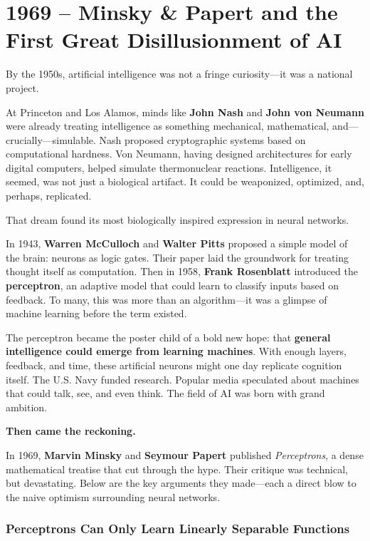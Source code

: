 \section{1969 – Minsky \& Papert and the First Great Disillusionment of AI}

By the 1950s, artificial intelligence was not a fringe curiosity—it was a national project.

At Princeton and Los Alamos, minds like \textbf{John Nash} and \textbf{John von Neumann} were already treating intelligence as something mechanical, mathematical, and—crucially—simulable. Nash proposed cryptographic systems based on computational hardness. Von Neumann, having designed architectures for early digital computers, helped simulate thermonuclear reactions. Intelligence, it seemed, was not just a biological artifact. It could be weaponized, optimized, and, perhaps, replicated.

That dream found its most biologically inspired expression in neural networks.

In 1943, \textbf{Warren McCulloch} and \textbf{Walter Pitts} proposed a simple model of the brain: neurons as logic gates. Their paper laid the groundwork for treating thought itself as computation. Then in 1958, \textbf{Frank Rosenblatt} introduced the \textbf{perceptron}, an adaptive model that could learn to classify inputs based on feedback. To many, this was more than an algorithm—it was a glimpse of machine learning before the term existed.

The perceptron became the poster child of a bold new hope: that \textbf{general intelligence could emerge from learning machines}. With enough layers, feedback, and time, these artificial neurons might one day replicate cognition itself. The U.S. Navy funded research. Popular media speculated about machines that could talk, see, and even think. The field of AI was born with grand ambition.

\medskip

\noindent\textbf{Then came the reckoning.}

In 1969, \textbf{Marvin Minsky} and \textbf{Seymour Papert} published \emph{Perceptrons}, a dense mathematical treatise that cut through the hype. Their critique was technical, but devastating. Below are the key arguments they made—each a direct blow to the naive optimism surrounding neural networks.

\subsubsection{Perceptrons Can Only Learn Linearly Separable Functions}

